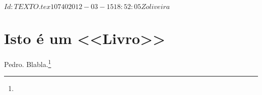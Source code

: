 \SVN $Id: TEXTO.tex 10740 2012-03-15 18:52:05Z oliveira $

\chapter{Isto é um <<Livro>>}  %

Pedro. Blabla.\footnote{ \lipsum[4]}

\lipsum[7-13]

\lipsum[15-19]

